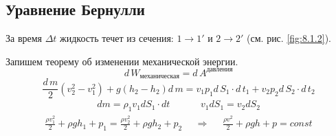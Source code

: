 \subsection{Уравнение Бернулли}
За время $\Delta t$ жидкость течет из сечения: \(1 \to  1' \text{ и } 2 \to 2'\) (см. рис. \ref{fig:8.1.2}).

Запишем теорему об изменении механической энергии.
\[d \, W_{\text{механическая}} = d \, A^{\text{давления}}\]
\[\frac{d \, m}{2}(v_2^2 - v_1^2) + g(h_2 - h_2) d \, m = v_1 p_1 d \, S_1 \cdot d \,t_1+v_2 p_2 d \, S_2 \cdot d \,t_2\]
\[\begin{aligned}
	d m = \rho_1 v_1 d S_1 \cdot d t && &&  v_1 dS_1 = v_2 dS_2
\end{aligned}\]
\[\begin{aligned}
	\frac{\rho v_1^2}{2} + \rho g h_1 + p_1 = \frac{\rho v_2^2}{2} + \rho gh_2 + p_2 && \Rightarrow && \boxed{\frac{\rho v^2}{2} + \rho g h + p = const}
\end{aligned}\]


